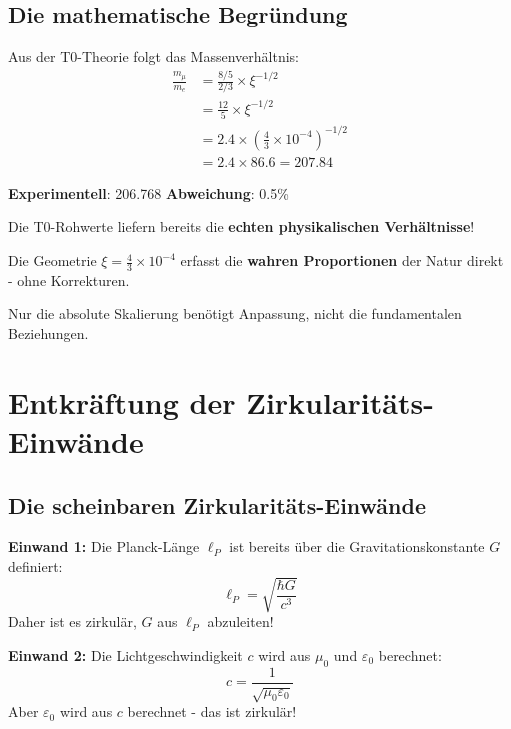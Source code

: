 \documentclass[12pt,a4paper]{article}
\theoremstyle{definition}
\begin{document}
	\subsection{Die mathematische Begr\"undung}
	
	Aus der T0-Theorie folgt das Massenverh\"altnis:
	\begin{align}
		\frac{m_\mu}{m_e} &= \frac{8/5}{2/3} \times \xi^{-1/2} \\
		&= \frac{12}{5} \times \xi^{-1/2} \\
		&= 2.4 \times \left(\frac{4}{3} \times 10^{-4}\right)^{-1/2} \\
		&= 2.4 \times 86.6 = 207.84
	\end{align}
	
	\textbf{Experimentell}: 206.768 \quad \textbf{Abweichung}: 0.5\%
	
	\begin{tcolorbox}[colback=green!5!white,colframe=green!75!black,title=Revolution\"are Schlussfolgerung]
		Die T0-Rohwerte liefern bereits die \textbf{echten physikalischen Verh\"altnisse}!
		
		Die Geometrie $\xi = \frac{4}{3} \times 10^{-4}$ erfasst die \textbf{wahren Proportionen} der Natur direkt - ohne Korrekturen.
		
		Nur die absolute Skalierung ben\"otigt Anpassung, nicht die fundamentalen Beziehungen.
	\end{tcolorbox}
	
	\section{Entkr\"aftung der Zirkularit\"ats-Einw\"ande}
	
	\subsection{Die scheinbaren Zirkularit\"ats-Einw\"ande}
	
	\begin{tcolorbox}[colback=red!10!white,colframe=red!75!black,title=H\"aufige Kritikpunkte]
		\textbf{Einwand 1:} Die Planck-L\"ange $\ell_P$ ist bereits \"uber die Gravitationskonstante $G$ definiert:
		\begin{equation}
			\ell_P = \sqrt{\frac{\hbar G}{c^3}}
		\end{equation}
		Daher ist es zirkul\"ar, $G$ aus $\ell_P$ abzuleiten!
		
		\textbf{Einwand 2:} Die Lichtgeschwindigkeit $c$ wird aus $\mu_0$ und $\varepsilon_0$ berechnet:
		\begin{equation}
			c = \frac{1}{\sqrt{\mu_0 \varepsilon_0}}
		\end{equation}
		Aber $\varepsilon_0$ wird aus $c$ berechnet - das ist zirkul\"ar!
	\end{tcolorbox}
	
\end{document}
